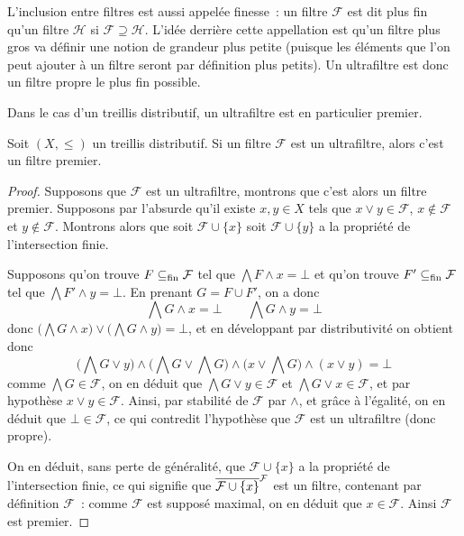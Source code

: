 \begin{remark}
  L'inclusion entre filtres est aussi appelée \og finesse\fg~: un filtre
  $\mathcal F$ est dit plus fin qu'un filtre $\mathcal H$ si
  $\mathcal F\supseteq\mathcal H$. L'idée derrière cette appellation est qu'un
  filtre plus gros va définir une notion de grandeur plus petite (puisque les
  éléments que l'on peut ajouter à un filtre seront par définition plus petits).
  Un ultrafiltre est donc un filtre propre le plus fin possible.
\end{remark}

Dans le cas d'un treillis distributif, un ultrafiltre est en particulier
premier.

\begin{proposition}
  Soit $(X,\leq)$ un treillis distributif. Si un filtre $\mathcal F$ est un
  ultrafiltre, alors c'est un filtre premier.
\end{proposition}

\begin{proof}
  Supposons que $\mathcal F$ est un ultrafiltre, montrons que c'est alors un
  filtre premier. Supposons par l'absurde qu'il existe $x,y\in X$ tels que
  $x\lor y \in \mathcal F$, $x\notin\mathcal F$ et $y\notin\mathcal F$.
  Montrons alors que soit $\mathcal F\cup\{x\}$ soit $\mathcal F\cup\{y\}$ a la
  propriété de l'intersection finie.

  Supposons qu'on trouve $F\subseteq_{\mathrm{fin}} \mathcal F$ tel que
  $\bigwedge F \land x =\bot$ et qu'on trouve $F'\subseteq_{\mathrm{fin}}\mathcal F$ tel que
  $\bigwedge F' \land y = \bot$. En prenant $G = F \cup F'$, on a donc
  \[\bigwedge G \land x = \bot \qquad \bigwedge G \land y = \bot\]
  donc $\big(\bigwedge G \land x\big)\lor\big(\bigwedge G\land y\big) = \bot$,
  et en développant par distributivité on obtient donc
  \[\Bigg(\bigwedge G \lor y\Bigg)\land\Bigg(\bigwedge G\lor \bigwedge G\Bigg)
  \land \Bigg(x\lor \bigwedge G\Bigg)\land(x\lor y) = \bot\]
  comme $\bigwedge G\in \mathcal F$, on en déduit que
  $\bigwedge G \lor y \in \mathcal F$ et $\bigwedge G \lor x \in \mathcal F$,
  et par hypothèse $x\lor y \in \mathcal F$. Ainsi, par stabilité de
  $\mathcal F$ par $\land$, et grâce à l'égalité, on en déduit que
  $\bot\in\mathcal F$, ce qui contredit l'hypothèse que $\mathcal F$ est un
  ultrafiltre (donc propre).

  On en déduit, sans perte de généralité, que $\mathcal F\cup\{x\}$ a la
  propriété de l'intersection finie, ce qui signifie que
  $\overline{\mathcal F\cup\{x\}}^{\mathcal F}$ est un filtre, contenant par définition
  $\mathcal F$~: comme $\mathcal F$ est supposé maximal, on en déduit que
  $x\in \mathcal F$. Ainsi $\mathcal F$ est premier.
\end{proof}

